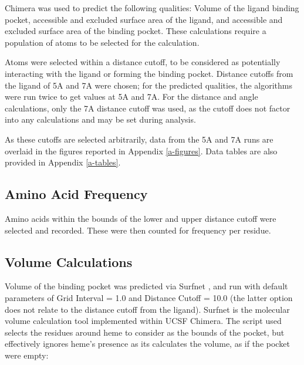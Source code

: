 \documentclass[a4paper, nobind]{templates/ociamthesis}
\begin{document}
Chimera was used to predict the following qualities: Volume of the ligand binding pocket, accessible and excluded surface area of the ligand, and accessible and excluded surface area of the binding pocket. These calculations require a population of atoms to be selected for the calculation.

Atoms were selected within a distance cutoff, to be considered as potentially interacting with the ligand or forming the binding pocket. Distance cutoffs from the ligand of 5A and 7A were chosen; for the predicted qualities, the algorithms were run twice to get values at 5A and 7A. For the distance and angle calculations, only the 7A distance cutoff was used, as the cutoff does not factor into any calculations and may be set during analysis.

As these cutoffs are selected arbitrarily, data from the 5A and 7A runs are overlaid in the figures reported in Appendix \ref{a-figures}. Data tables are also provided in Appendix \ref{a-tables}.

\hypertarget{amino-acid-frequency}{%
\subsection{Amino Acid Frequency}\label{amino-acid-frequency}}

Amino acids within the bounds of the lower and upper distance cutoff were selected and recorded. These were then counted for frequency per residue.

\hypertarget{volume-calculations}{%
\subsection{Volume Calculations}\label{volume-calculations}}

Volume of the binding pocket was predicted via Surfnet \autocite{Laskowski1995}, and run with default parameters of Grid Interval = 1.0 and Distance Cutoff = 10.0 (the latter option does not relate to the distance cutoff from the ligand). Surfnet is the molecular volume calculation tool implemented within UCSF Chimera. The script used selects the residues around heme to consider as the bounds of the pocket, but effectively ignores heme's presence as its calculates the volume, as if the pocket were empty:
\end{document}
